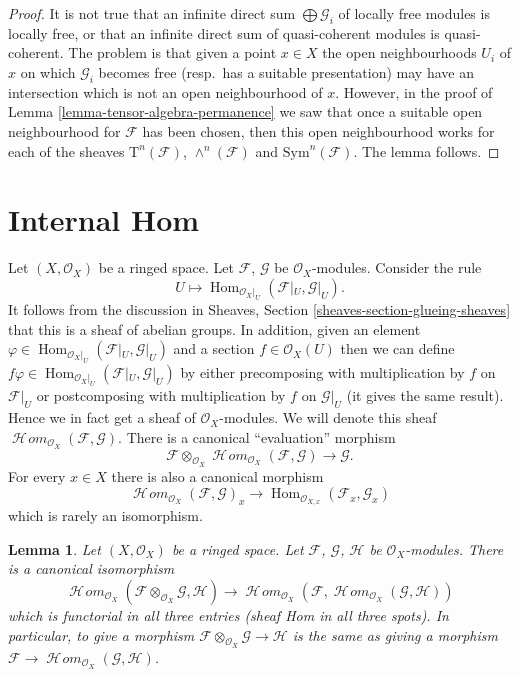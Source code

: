 \documentclass{stacks-project}
\theoremstyle{plain}
\newtheorem{lemma}[subsection]{Lemma}
\theoremstyle{definition}
\theoremstyle{remark}
\numberwithin{equation}{subsection}
\def\Hom{\mathop{\mathrm{Hom}}\nolimits}
\def\SheafHom{\mathop{\mathcal{H}\!\mathit{om}}\nolimits}
\begin{document}
\begin{proof}
It is not true that an infinite direct sum $\bigoplus \mathcal{G}_i$ of
locally free modules is locally free, or that an
infinite direct sum of quasi-coherent modules
is quasi-coherent. The problem is that given a
point $x \in X$ the open neighbourhoods $U_i$ of $x$ on which $\mathcal{G}_i$
becomes free (resp.\ has a suitable presentation) may have an intersection
which is not an open neighbourhood of $x$. However, in the
proof of Lemma \ref{lemma-tensor-algebra-permanence} we saw that
once a suitable open neighbourhood for $\mathcal{F}$ has been chosen,
then this open neighbourhood works for each of the sheaves
$\text{T}^n(\mathcal{F})$, $\wedge^n(\mathcal{F})$ and
$\text{Sym}^n(\mathcal{F})$.
The lemma follows.
\end{proof}







\section{Internal Hom}
\label{section-internal-hom}

\noindent
Let $(X, \mathcal{O}_X)$ be a ringed space.
Let $\mathcal{F}$, $\mathcal{G}$ be $\mathcal{O}_X$-modules.
Consider the rule
$$
U \longmapsto \Hom_{\mathcal{O}_X|_U}(\mathcal{F}|_U, \mathcal{G}|_U).
$$
It follows from the discussion in Sheaves, Section
\ref{sheaves-section-glueing-sheaves} that this is a sheaf of
abelian groups. In addition, given an element
$\varphi \in \Hom_{\mathcal{O}_X|_U}(\mathcal{F}|_U, \mathcal{G}|_U)$
and a section $f \in \mathcal{O}_X(U)$ then we can define
$f\varphi \in \Hom_{\mathcal{O}_X|_U}(\mathcal{F}|_U, \mathcal{G}|_U)$
by either precomposing with multiplication by $f$ on $\mathcal{F}|_U$
or postcomposing with multiplication by $f$ on $\mathcal{G}|_U$ (it gives
the same result). Hence we in fact get a sheaf of $\mathcal{O}_X$-modules.
We will denote this sheaf
$\SheafHom_{\mathcal{O}_X}(\mathcal{F}, \mathcal{G})$.
There is a canonical ``evaluation'' morphism
$$
\mathcal{F}
\otimes_{\mathcal{O}_X}
\SheafHom_{\mathcal{O}_X}(\mathcal{F}, \mathcal{G})
\longrightarrow
\mathcal{G}.
$$
For every $x \in X$ there is also a canonical morphism
$$
\SheafHom_{\mathcal{O}_X}(\mathcal{F}, \mathcal{G})_x
\to
\Hom_{\mathcal{O}_{X, x}}(\mathcal{F}_x, \mathcal{G}_x)
$$
which is rarely an isomorphism.

\begin{lemma}
\label{lemma-internal-hom}
Let $(X, \mathcal{O}_X)$ be a ringed space.
Let $\mathcal{F}$, $\mathcal{G}$, $\mathcal{H}$ be $\mathcal{O}_X$-modules.
There is a canonical isomorphism
$$
\SheafHom_{\mathcal{O}_X}
(\mathcal{F} \otimes_{\mathcal{O}_X} \mathcal{G}, \mathcal{H})
\longrightarrow
\SheafHom_{\mathcal{O}_X}
(\mathcal{F}, \SheafHom_{\mathcal{O}_X}(\mathcal{G}, \mathcal{H}))
$$
which is functorial in all three entries (sheaf Hom in
all three spots). In particular, to give a
morphism $\mathcal{F} \otimes_{\mathcal{O}_X} \mathcal{G} \to \mathcal{H}$
is the same as giving a morphism
$\mathcal{F} \to \SheafHom_{\mathcal{O}_X}(\mathcal{G}, \mathcal{H})$.
\end{lemma}
\end{document}
